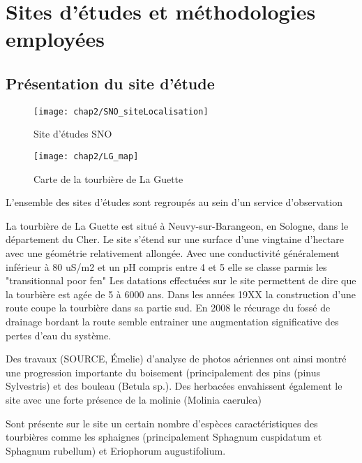 
\chapter{Sites d'études et méthodologies employées}
\newpage

\section{Présentation du site d'étude}

\begin{figure}
\centering
\texttt{[image: chap2/SNO\_siteLocalisation]}
\caption{Site d'études SNO}
\label{fig:carte_europe}
\end{figure}

\begin{figure}
\texttt{[image: chap2/LG\_map]}
\caption{Carte de la tourbière de La Guette}
\label{fig:carte_LG}
\end{figure}


L'ensemble des sites d'études sont regroupés au sein d'un service d'observation


La tourbière de La Guette est situé à Neuvy-sur-Barangeon, en Sologne, dans le département du Cher.
Le site s'étend sur une surface d'une vingtaine d'hectare avec une géométrie relativement allongée.
Avec une conductivité généralement inférieur à 80 uS/m2 et un pH compris entre 4 et 5 elle se classe parmis les "transitionnal poor fen"
Les datations effectuées sur le site permettent de dire que la tourbière est agée de 5 à 6000 ans.
Dans les années 19XX la construction d'une route coupe la tourbière dans sa partie sud.
En 2008 le récurage du fossé de drainage bordant la route semble entrainer une augmentation significative des pertes d'eau du système.

Des travaux (SOURCE, Émelie) d'analyse de photos aériennes ont ainsi montré une progression importante du boisement (principalement des pins (pinus Sylvestris) et des bouleau (Betula sp.). Des herbacées envahissent également le site avec une forte présence de la molinie (Molinia caerulea)

Sont présente sur le site un certain nombre d'espèces caractéristiques des tourbières comme les sphaignes (principalement Sphagnum cuspidatum et Sphagnum rubellum) et Eriophorum augustifolium.

